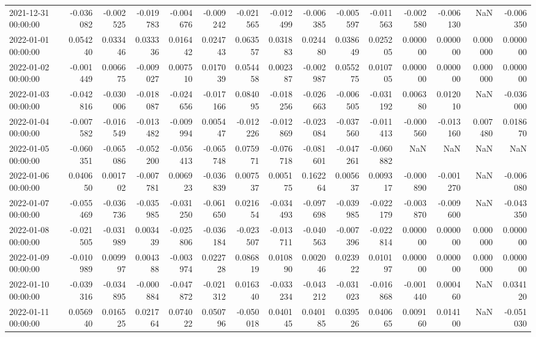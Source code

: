 \begin{tabular}{lrrrrrrrrrrrrrr}
2021-12-31 00:00:00 & -0.036082 & -0.002525 & -0.019783 & -0.004676 & -0.009242 & -0.021565 & -0.012499 & -0.006385 & -0.005597 & -0.011563 & -0.002580 & -0.006130 & NaN & -0.006350 \\
2022-01-01 00:00:00 & 0.054240 & 0.033446 & 0.033336 & 0.016442 & 0.024743 & 0.063557 & 0.031883 & 0.024480 & 0.038649 & 0.025205 & 0.000000 & 0.000000 & 0.000000 & 0.000000 \\
2022-01-02 00:00:00 & -0.001449 & 0.006675 & -0.009027 & 0.007510 & 0.017039 & 0.054458 & 0.002387 & -0.002987 & 0.055275 & 0.010705 & 0.000000 & 0.000000 & 0.000000 & 0.000000 \\
2022-01-03 00:00:00 & -0.042816 & -0.030006 & -0.018087 & -0.024656 & -0.017166 & 0.084095 & -0.018256 & -0.026663 & -0.006505 & -0.031192 & 0.006380 & 0.012010 & NaN & -0.036000 \\
2022-01-04 00:00:00 & -0.007582 & -0.016549 & -0.013482 & -0.009994 & 0.005447 & -0.012226 & -0.012869 & -0.023084 & -0.037560 & -0.011413 & -0.000560 & -0.013160 & 0.007480 & 0.018670 \\
2022-01-05 00:00:00 & -0.060351 & -0.065086 & -0.052200 & -0.056413 & -0.065748 & 0.075971 & -0.076718 & -0.081601 & -0.047261 & -0.060882 & NaN & NaN & NaN & NaN \\
2022-01-06 00:00:00 & 0.040650 & 0.001702 & -0.007781 & 0.006923 & -0.036839 & 0.007537 & 0.005175 & 0.162264 & 0.005637 & 0.009317 & -0.000890 & -0.001270 & NaN & -0.006080 \\
2022-01-07 00:00:00 & -0.055469 & -0.036736 & -0.035985 & -0.031250 & -0.061650 & 0.021654 & -0.034493 & -0.097698 & -0.039985 & -0.022179 & -0.003870 & -0.009600 & NaN & -0.043350 \\
2022-01-08 00:00:00 & -0.021505 & -0.031989 & 0.003439 & -0.025806 & -0.036184 & -0.023507 & -0.013711 & -0.040563 & -0.007396 & -0.022814 & 0.000000 & 0.000000 & 0.000000 & 0.000000 \\
2022-01-09 00:00:00 & -0.010989 & 0.009997 & 0.004388 & -0.003974 & 0.022728 & 0.086819 & 0.010890 & 0.002046 & 0.023922 & 0.010197 & 0.000000 & 0.000000 & 0.000000 & 0.000000 \\
2022-01-10 00:00:00 & -0.039316 & -0.034895 & -0.000884 & -0.047872 & -0.021312 & 0.016340 & -0.033234 & -0.043212 & -0.031023 & -0.016868 & -0.001440 & 0.000460 & NaN & 0.034120 \\
2022-01-11 00:00:00 & 0.056940 & 0.016525 & 0.021764 & 0.074022 & 0.050796 & -0.050018 & 0.040145 & 0.040185 & 0.039526 & 0.040665 & 0.009160 & 0.014100 & NaN & -0.051030 \\

\end{tabular}
